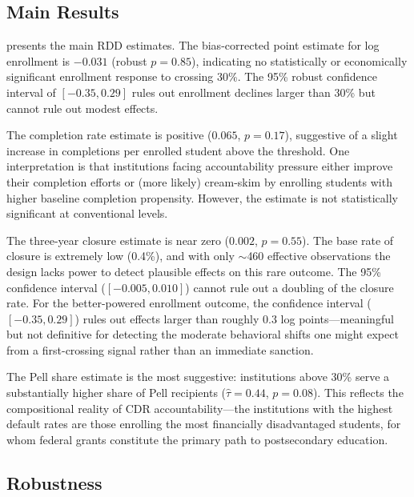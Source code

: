 \documentclass[12pt]{article}
\begin{document}
\subsection{Main Results}



 presents the main RDD estimates. The bias-corrected point estimate for log enrollment is $-0.031$ (robust $p=0.85$), indicating no statistically or economically significant enrollment response to crossing 30\%. The 95\% robust confidence interval of $[-0.35, 0.29]$ rules out enrollment declines larger than 30\% but cannot rule out modest effects.

The completion rate estimate is positive ($0.065$, $p=0.17$), suggestive of a slight increase in completions per enrolled student above the threshold. One interpretation is that institutions facing accountability pressure either improve their completion efforts or (more likely) cream-skim by enrolling students with higher baseline completion propensity. However, the estimate is not statistically significant at conventional levels.

The three-year closure estimate is near zero ($0.002$, $p=0.55$). The base rate of closure is extremely low (0.4\%), and with only $\sim$460 effective observations the design lacks power to detect plausible effects on this rare outcome. The 95\% confidence interval ($[-0.005, 0.010]$) cannot rule out a doubling of the closure rate. For the better-powered enrollment outcome, the confidence interval ($[-0.35, 0.29]$) rules out effects larger than roughly 0.3 log points---meaningful but not definitive for detecting the moderate behavioral shifts one might expect from a first-crossing signal rather than an immediate sanction.

The Pell share estimate is the most suggestive: institutions above 30\% serve a substantially higher share of Pell recipients ($\hat{\tau}=0.44$, $p=0.08$). This reflects the compositional reality of CDR accountability---the institutions with the highest default rates are those enrolling the most financially disadvantaged students, for whom federal grants constitute the primary path to postsecondary education.

\subsection{Robustness}


\end{document}
